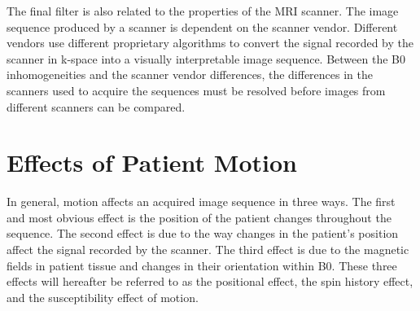 The final filter is also related to the properties of the MRI scanner. The image sequence produced by a scanner is dependent on the scanner vendor. Different vendors use different proprietary algorithms to convert the signal recorded by the scanner in k-space into a visually interpretable image sequence. Between the B0 inhomogeneities and the scanner vendor differences, the differences in the scanners used to acquire the sequences must be resolved before images from different scanners can be compared.




\section{Effects of Patient Motion}

In general, motion affects an acquired image sequence in three ways. The first and most obvious effect is the position of the patient changes throughout the sequence. The second effect is due to the way changes in the patient's position affect the signal recorded by the scanner. The third effect is due to the magnetic fields in patient tissue and changes in their orientation within B0. These three effects will hereafter be referred to as the positional effect, the spin history effect, and the susceptibility effect of motion.

